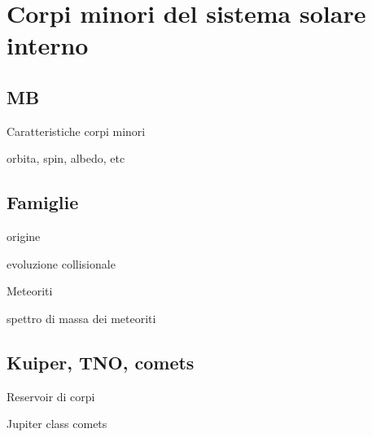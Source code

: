 \section{Corpi minori del sistema solare interno}

\subsection{MB}

\begin{frame}{Caratteristiche corpi minori}

\end{frame}

\begin{wordonframe}{orbita, spin, albedo, etc}

\end{wordonframe}

\subsection{Famiglie}

\begin{frame}{origine}

\end{frame}

\begin{wordonframe}{evoluzione collisionale}

\end{wordonframe}

\begin{frame}{Meteoriti}

\end{frame}

\begin{wordonframe}{spettro di massa dei meteoriti}

\end{wordonframe}

\subsection{Kuiper, TNO, comets}

\begin{frame}{Reservoir di corpi}

\end{frame}

\begin{wordonframe}{Jupiter class comets}

\end{wordonframe}